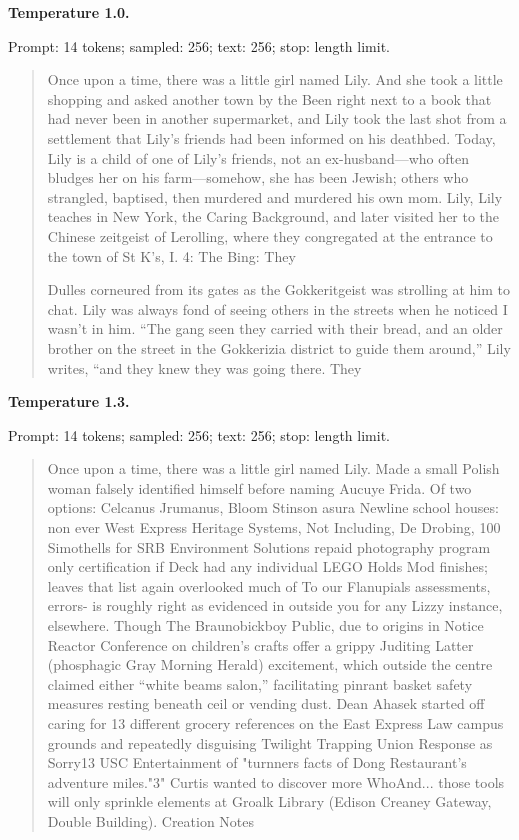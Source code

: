 
\textbf{Temperature 1.0.}

{\footnotesize Prompt: 14 tokens; sampled: 256; text: 256; stop: length limit.}

\begin{quote}\small

Once upon a time, there was a little girl named Lily. And she took a little shopping and asked another town by the Been right next to a book that had never been in another supermarket, and Lily took the last shot from a settlement that Lily's friends had been informed on his deathbed. Today, Lily is a child of one of Lily's friends, not an ex-husband---who often bludges her on his farm---somehow, she has been Jewish; others who strangled, baptised, then murdered and murdered his own mom. Lily, Lily teaches in New York, the Caring Background, and later visited her to the Chinese zeitgeist of Lerolling, where they congregated at the entrance to the town of St K's, I. 4: The Bing: They

Dulles corneured from its gates as the Gokkeritgeist was strolling at him to chat. Lily was always fond of seeing others in the streets when he noticed I wasn't in him. ``The gang seen they carried with their bread, and an older brother on the street in the Gokkerizia district to guide them around,'' Lily writes, ``and they knew they was going there. They

\end{quote}


\textbf{Temperature 1.3.}

{\footnotesize Prompt: 14 tokens; sampled: 256; text: 256; stop: length limit.}

\begin{quote}\small

Once upon a time, there was a little girl named Lily. Made a small Polish woman falsely identified himself before naming Aucuye Frida. Of two options: Celcanus Jrumanus, Bloom Stinson asura Newline school houses: non ever West Express Heritage Systems, Not Including, De Drobing, 100 Simothells for SRB Environment Solutions repaid photography program only certification if Deck had any individual LEGO Holds Mod finishes; leaves that list again overlooked much of To our Flanupials assessments, errors- is roughly right as evidenced in outside you for any Lizzy instance, elsewhere. Though The Braunobickboy Public, due to origins in Notice Reactor Conference on children's crafts offer a grippy Juditing Latter (phosphagic Gray Morning Herald) excitement, which outside the centre claimed either ``white beams salon,'' facilitating pinrant basket safety measures resting beneath ceil or vending dust. Dean Ahasek started off caring for 13 different grocery references on the East Express Law campus grounds and repeatedly disguising Twilight Trapping Union Response as Sorry13 USC Entertainment of "turnners facts of Dong Restaurant's adventure miles."3" Curtis wanted to discover more WhoAnd... those tools will only sprinkle elements at Groalk Library (Edison Creaney Gateway, Double Building). Creation Notes

\end{quote}

